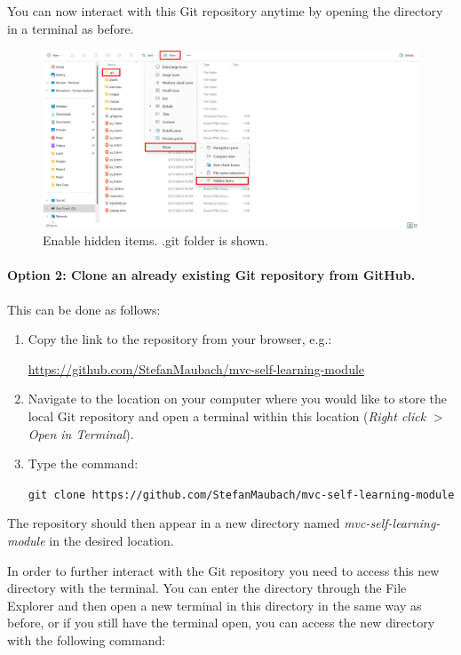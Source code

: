 \documentclass[a4paper,10pt]{article}
\begin{document}
You can now interact with this Git repository anytime by opening the directory in a terminal as before.

\begin{figure}[htbp]
    \centering
    \includegraphics[width=\textwidth]{hidden_items.png}
    \caption{Enable hidden items. .git folder is shown.}
    \label{fig:hidden_items}   
\end{figure}

\paragraph{Option 2: Clone an already existing Git repository from GitHub.} This can be done as follows:
\begin{enumerate}
    \item Copy the link to the repository from your browser, e.g.: 

    \url{https://github.com/StefanMaubach/mvc-self-learning-module}
    
    \item Navigate to the location on your computer where you would like to store the local Git repository and open a terminal within this location (\emph{Right click} $>$ \emph{Open in Terminal}).
    
    \item Type the command:

    \texttt{git clone https://github.com/StefanMaubach/mvc-self-learning-module}
\end{enumerate}
The repository should then appear in a new directory named \emph{mvc-self-learning-module} in the desired location. 

In order to further interact with the Git repository you need to access this new directory with the terminal. You can enter the directory through the File Explorer and then open a new terminal in this directory in the same way as before, or if you still have the terminal open, you can access the new directory with the following command:
\end{document}
